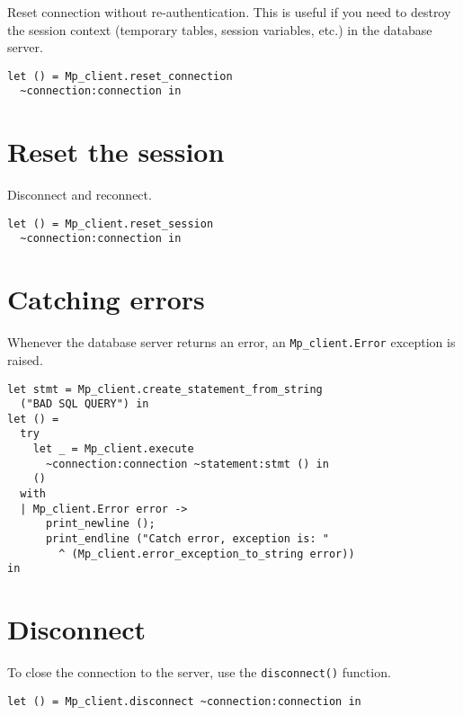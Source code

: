 \documentclass[a4paper, english, 11pt]{article}
\begin{document}
Reset connection without re-authentication. This is useful if you need to destroy the session context (temporary tables, session variables, etc.) in the database server.

\begin{verbatim}
let () = Mp_client.reset_connection
  ~connection:connection in
\end{verbatim}

\section{Reset the session}

Disconnect and reconnect.

\begin{verbatim}
let () = Mp_client.reset_session 
  ~connection:connection in
\end{verbatim}

\section{Catching errors}

Whenever the database server returns an error, an \texttt{Mp\_client.Error} exception is raised.

\begin{verbatim}
let stmt = Mp_client.create_statement_from_string 
  ("BAD SQL QUERY") in
let () =
  try
    let _ = Mp_client.execute
      ~connection:connection ~statement:stmt () in 
    ()
  with
  | Mp_client.Error error ->
      print_newline ();
      print_endline ("Catch error, exception is: " 
        ^ (Mp_client.error_exception_to_string error))
in
\end{verbatim}

\section{Disconnect}

To close the connection to the server, use the \texttt{disconnect()} function.

\begin{verbatim}
let () = Mp_client.disconnect ~connection:connection in
\end{verbatim}
\end{document}
